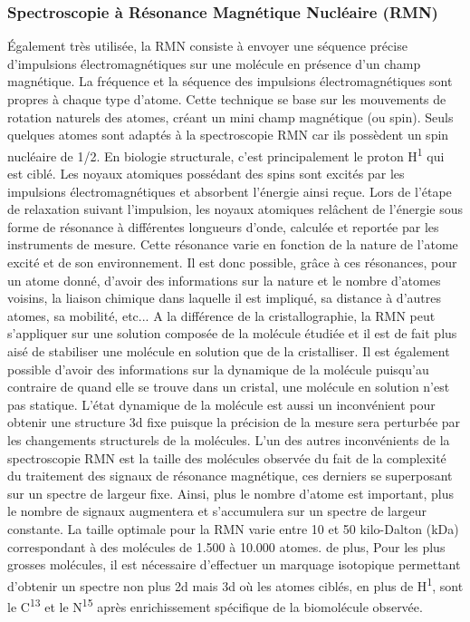 \subsubsection{Spectroscopie à Résonance Magnétique Nucléaire (RMN)}

Également très utilisée, la RMN consiste à envoyer une séquence précise d'impulsions électromagnétiques sur une molécule en présence d'un champ magnétique. La fréquence et la séquence des impulsions électromagnétiques sont propres à chaque type d'atome. Cette technique se base sur les mouvements de rotation naturels des atomes, créant un mini champ magnétique (ou spin). Seuls quelques atomes sont adaptés à la spectroscopie RMN car ils possèdent un spin nucléaire de 1/2. En biologie structurale, c'est principalement le proton H\textsuperscript{1} qui est ciblé. Les noyaux atomiques possédant des spins sont excités par les impulsions électromagnétiques et absorbent l'énergie ainsi reçue. Lors de l'étape de relaxation suivant l'impulsion, les noyaux atomiques relâchent de l'énergie sous forme de résonance à différentes longueurs d'onde, calculée et reportée par les instruments de mesure. Cette résonance varie en fonction de la nature de l'atome excité et de son environnement. Il est donc possible, grâce à ces résonances, pour un atome donné, d'avoir des informations sur la nature et le nombre d'atomes voisins, la liaison chimique dans laquelle il est impliqué, sa distance à d'autres atomes, sa mobilité, etc... A la différence de la cristallographie, la RMN peut s'appliquer sur une solution composée de la molécule étudiée et il est de fait plus aisé de stabiliser une molécule en solution que de la cristalliser. Il est également possible d'avoir des informations sur la dynamique de la molécule puisqu'au contraire de quand elle se trouve dans un cristal, une molécule en solution n'est pas statique.
L'état dynamique de la molécule est aussi un inconvénient pour obtenir une structure 3d fixe puisque la précision de la mesure sera perturbée par les changements structurels de la molécules. L'un des autres inconvénients de la spectroscopie RMN est la taille des molécules observée du fait de la complexité du traitement des signaux de résonance magnétique, ces derniers se superposant sur un spectre de largeur fixe. Ainsi, plus le nombre d'atome est important, plus le nombre de signaux augmentera et s'accumulera sur un spectre de largeur constante. La taille optimale pour la RMN varie entre 10 et 50 kilo-Dalton (kDa) correspondant à des molécules de 1.500 à 10.000 atomes. de plus, Pour les plus grosses molécules, il est nécessaire d'effectuer un marquage isotopique permettant d'obtenir un spectre non plus 2d mais 3d où les atomes ciblés, en plus de H\textsuperscript{1}, sont le C\textsuperscript{13} et le N\textsuperscript{15} après enrichissement spécifique de la biomolécule observée.

